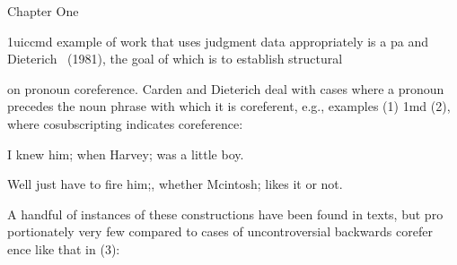 \clearpage\setcounter{page}{1}\begin{styleStandard}
Chapter One
\end{styleStandard}


\begin{styleStandard}
1uiccmd example of work that uses judgment data appropriately is a pa\- and Dieterich \ (1981), the goal of which is to establish structural
\end{styleStandard}


\begin{styleStandard}
on pronoun coreference. Carden and Dieterich deal with cases where a pronoun precedes the noun phrase with which it is coreferent, e.g., examples (1) 1md (2), where cosubscripting indicates coreference:
\end{styleStandard}


\setcounter{listWWNumlxviiileveli}{0}
\begin{listWWNumlxviiileveli}
\item 
\begin{styleStandard}
I knew him; when Harvey; was a little boy.
\end{styleStandard}


\item 
\begin{styleStandard}
We{\textquotesingle}ll just have to fire him;, whether Mcintosh; likes it or not.
\end{styleStandard}


\end{listWWNumlxviiileveli}
\begin{styleStandard}
A handful of instances of these constructions have been found in texts, but pro\- portionately very few compared to cases of uncontroversial backwards corefer\- ence like that in (3):
\end{styleStandard}


